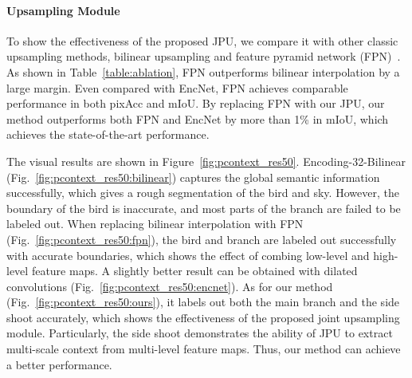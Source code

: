 \documentclass[10pt,twocolumn,letterpaper]{article}
\begin{document}
\paragraph{Upsampling Module}
To show the effectiveness of the proposed JPU, we compare it with other classic upsampling methods, bilinear upsampling and feature pyramid network (FPN)~\cite{lin2017feature}.
As shown in Table~\ref{table:ablation}, FPN outperforms bilinear interpolation by a large margin.
Even compared with EncNet, FPN achieves comparable performance in both pixAcc and mIoU.
By replacing FPN with our JPU, our method outperforms both FPN and EncNet by more than 1\% in mIoU, which achieves the state-of-the-art performance.

The visual results are shown in Figure~\ref{fig:pcontext_res50}.
Encoding-32-Bilinear (Fig.~\ref{fig:pcontext_res50:bilinear}) captures the global semantic information successfully, which gives a rough segmentation of the bird and sky.
However, the boundary of the bird is inaccurate, and most parts of the branch are failed to be labeled out.
When replacing bilinear interpolation with FPN (Fig.~\ref{fig:pcontext_res50:fpn}), the bird and branch are labeled out successfully with accurate boundaries, which shows the effect of combing low-level and high-level feature maps.
A slightly better result can be obtained with dilated convolutions (Fig.~\ref{fig:pcontext_res50:encnet}).
As for our method (Fig.~\ref{fig:pcontext_res50:ours}), it labels out both the main branch and the side shoot accurately, which shows the effectiveness of the proposed joint upsampling module.
Particularly, the side shoot demonstrates the ability of JPU to extract multi-scale context from multi-level feature maps.
Thus, our method can achieve a better performance.
\vspace{-1em}
\end{document}
